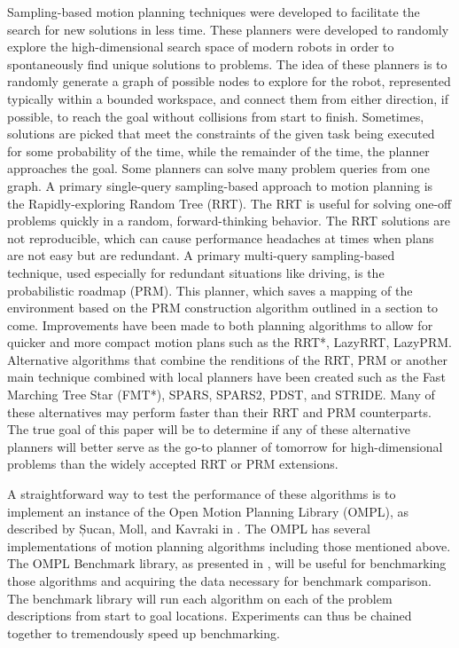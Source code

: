 \documentclass[conference]{IEEEtran} \usepackage[T1]{fontenc} \usepackage[backend=biber, style=ieee]{biblatex}
\begin{document}
Sampling-based motion planning techniques were developed to facilitate the search for new solutions in less time. These planners were developed to randomly explore the
high-dimensional search space of modern robots in order to spontaneously find unique solutions to problems. The idea of these planners is to randomly generate a graph
of possible nodes to explore for the robot, represented typically within a bounded workspace, and connect them from either direction, if possible, to reach the goal 
without collisions from start to finish. Sometimes, solutions are picked that meet the constraints of the given task being executed for some probability of the time, 
while the remainder of the time, the planner approaches the goal. Some planners can solve many problem queries from one graph. A primary single-query sampling-based approach to 
motion planning is the Rapidly-exploring Random Tree (RRT). The RRT is useful for solving one-off problems quickly in a random, forward-thinking behavior.  The RRT solutions are
not reproducible, which can cause performance headaches at times when plans are not easy but are redundant. A primary multi-query sampling-based technique, used especially for 
redundant situations like driving, is the probabilistic roadmap (PRM). This planner, which saves a mapping of the environment based on the PRM construction algorithm outlined in
a section to come. Improvements have been made to both planning algorithms to allow for quicker and more compact motion plans such as the RRT*, LazyRRT, LazyPRM. Alternative
algorithms that combine the renditions of the RRT, PRM or another main technique combined with local planners have been created such as the Fast Marching Tree 
Star (FMT*), SPARS, SPARS2, PDST, and STRIDE. Many of these alternatives may perform faster than their RRT and PRM counterparts. The true goal of  this paper will be
to determine if any of these alternative planners will better serve as the go-to planner of tomorrow for high-dimensional problems than the widely accepted RRT or PRM extensions.

A straightforward way to test the performance of these algorithms is to implement an instance 
of the Open Motion Planning Library (OMPL), as described by Șucan, Moll, and Kavraki in \cite{ompl}. The OMPL has several implementations of motion planning algorithms 
including those mentioned above. The OMPL Benchmark library, as presented in \cite{ompl_benchmark}, will be useful for benchmarking those algorithms and acquiring the
data necessary for benchmark comparison. The benchmark library will run each algorithm on each of the problem descriptions from start to goal locations. 
Experiments can thus be chained together to tremendously speed up benchmarking.
\end{document}

